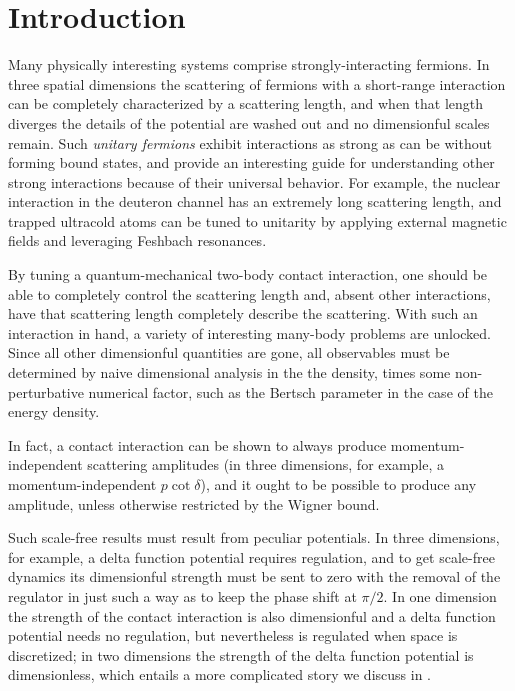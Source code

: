 \section{Introduction}\label{sec:intro}

Many physically interesting systems comprise strongly-interacting fermions.
In three spatial dimensions the scattering of fermions with a short-range interaction can be completely characterized by a scattering length, and when that length diverges the details of the potential are washed out and no dimensionful scales remain.
Such \emph{unitary fermions} exhibit interactions as strong as can be without forming bound states, and provide an interesting guide for understanding other strong interactions because of their universal behavior.
For example, the nuclear interaction in the deuteron channel has an extremely long scattering length, and trapped ultracold atoms can be tuned to unitarity by applying external magnetic fields and leveraging Feshbach resonances.

By tuning a quantum-mechanical two-body contact interaction, one should be able to completely control the scattering length and, absent other interactions, have that scattering length completely describe the scattering.
With such an interaction in hand, a variety of interesting many-body problems are unlocked.
Since all other dimensionful quantities are gone, all observables must be determined by naive dimensional analysis in the the density, times some non-perturbative numerical factor, such as the Bertsch parameter\cite{PhysRevC.60.054311} in the case of the energy density.

In fact, a contact interaction can be shown to always produce momentum-independent scattering amplitudes (in three dimensions, for example, a momentum-independent $p \cot \delta$), and it ought to be possible to produce any amplitude, unless otherwise restricted by the Wigner bound\cite{Wigner:1955zz,Phillips:1996ae,Hammer:2010fw}.

Such scale-free results must result from peculiar potentials.
In three dimensions, for example, a delta function potential requires regulation, and to get scale-free dynamics its dimensionful strength must be sent to zero with the removal of the regulator in just such a way as to keep the phase shift at $\pi/2$.
In one dimension the strength of the contact interaction is also dimensionful and a delta function potential needs no regulation, but nevertheless is regulated when space is discretized; in two dimensions the strength of the delta function potential is dimensionless, which entails a more complicated story we discuss in .

